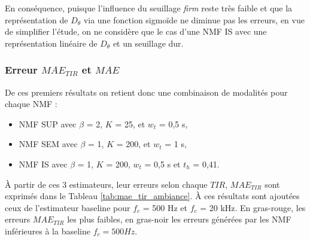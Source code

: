 En conséquence, puisque l'influence du seuillage \textit{firm} reste très faible et que la représentation de $D_{\theta}$ via une fonction sigmoïde ne diminue pas les erreurs, en vue de simplifier l'étude, on ne considère que le cas d'une NMF IS avec une représentation linéaire de $D_{\theta}$ et un seuillage dur. 

\subsubsection{Erreur $MAE_{TIR}$ et $MAE$}

De ces premiers résultats on retient donc une combinaison de modalités pour chaque NMF : 

\begin{itemize}
\item NMF SUP avec $\beta$ = 2, $K$ = 25, et $w_t$ = 0,5 s, 
\item NMF SEM avec $\beta$ = 1, $K$ = 200, et $w_t$ = 1 s, 
\item NMF IS avec $\beta$ = 1, $K$ = 200, $w_t$ = 0,5 s et $t_h$ = 0,41.\\
\end{itemize}

À partir de ces 3 estimateurs, leur erreurs selon chaque $TIR$, $MAE_{TIR}$ sont exprimés dans le Tableau \ref{tab:mae_tir_ambiance}. À ces résultats sont ajoutées ceux de l'estimateur baseline pour $f_c$ = 500 Hz et $f_c$ = 20 kHz. En gras-rouge, les erreurs $MAE_{TIR}$ les plus faibles, en gras-noir les erreurs générées par les NMF inférieures à la baseline $f_c = 500 Hz$.

\begin{table}[h]
\centering
\caption{Erreurs $MAE_{TIR}$ selon les combinaisons optimales de la NMF SUP, SEM et IS.}
\label{tab:mae_tir_ambiance}
\end{table}

